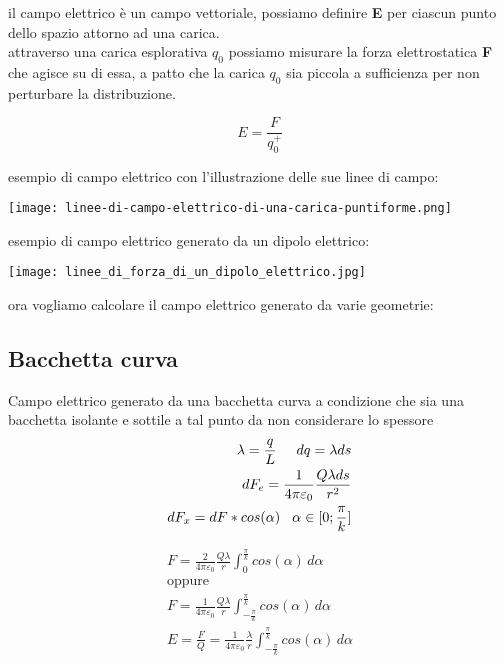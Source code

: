 \documentclass[a4paper,11pt]{article}
\begin{document}
il campo elettrico è un campo vettoriale, possiamo definire \textbf{E} per ciascun punto dello spazio attorno ad una carica.
\\
attraverso una carica esplorativa \(q_0\) possiamo misurare la forza elettrostatica \textbf{F} che agisce su di essa, a patto che la carica \(q_0\) sia piccola a sufficienza per non perturbare la distribuzione. 
\begin{center}
    \[
    E = \frac{F}{q_0^+}
    \]
\end{center}
esempio di campo elettrico con l'illustrazione delle sue linee di campo:
\begin{center}
    \texttt{[image: linee-di-campo-elettrico-di-una-carica-puntiforme.png]}
\end{center}
\pagebreak
esempio di campo elettrico generato da un dipolo elettrico:
\begin{center}
    \texttt{[image: linee\_di\_forza\_di\_un\_dipolo\_elettrico.jpg]}
\end{center}

ora vogliamo calcolare il campo elettrico generato da varie geometrie:
\\
\subsection{Bacchetta curva}
Campo elettrico generato da una bacchetta curva a condizione che sia una bacchetta isolante e sottile a tal punto da non considerare lo spessore
\begin{align*}
    \lambda = \frac{q}{L} \hspace{5mm} dq = \lambda ds 
    \\
    dF_e = \frac{1}{4\pi\varepsilon_0} \frac{Q\lambda ds}{r^2} 
    \\
    dF_x = dF * cos(\alpha) \hspace{3mm} \alpha \in [0;\frac{\pi}{k}]
\end{align*}

\begin{align*}
    F = \frac{2}{4 \pi \varepsilon_0} \frac{Q \lambda}{r} \int_{0}^{\frac{\pi}{k}} cos(\alpha) \,d\alpha 
    \\
    \text{oppure}
    \\
    F = \frac{1}{4 \pi \varepsilon_0} \frac{Q \lambda}{r} \int_{-\frac{\pi}{k}}^{\frac{\pi}{k}} cos(\alpha) \,d\alpha 
    \\
    E = \frac{F}{Q} = \frac{1}{4 \pi \varepsilon_0} \frac{ \lambda}{r} \int_{-\frac{\pi}{k}}^{\frac{\pi}{k}} cos(\alpha) \,d\alpha 
\end{align*}
\end{document}
